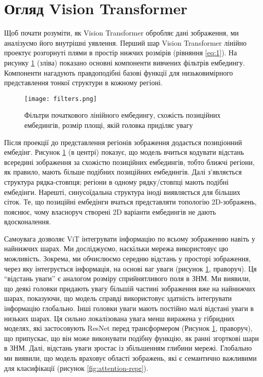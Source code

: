 \section{Огляд Vision Transformer}
Щоб почати розуміти, як Vision Transformer обробляє дані
зображення, ми аналізуємо його внутрішні уявлення. Перший шар
Vision Transformer лінійно проектує розгорнуті плями в простір
нижчих розмірів (рівняння \ref{eq:1}).
На рисунку \ref{fig:filters} (зліва) показано основні
компоненти вивчених фільтрів ембедингу.
Компоненти нагадують правдоподібні базові функції
для низьковимірного представлення тонкої структури в кожному
регіоні.

\begin{figure}[H]
    \centering
    \texttt{[image: filters.png]}
    \caption{Фільтри початкового лінійного ембедингу, схожість позиційних ембедингів, розмір площі, якій головка приділяє увагу}
    \label{fig:filters}
\end{figure}

Після проекції до представлення регіонів зображення додається
позиціонний ембедінг. Рисунок \ref{fig:filters} (в центрі) показує,
що модель вчиться кодувати відстань всередині зображення за схожістю
позиційних ембедингів, тобто ближчі регіони, як правило, мають більше
подібних позиційних ембедингів. Далі з'являється структура рядка-стовпця;
регіони в одному рядку/стовпці мають подібні ембедінги.
Нарешті, синусоїдальна структура іноді виявляється для більших сіток.
Те, що позиційні ембедінги вчаться представляти
топологію 2D-зображень, пояснює, чому власноруч
створені 2D варіанти ембедингів не дають
вдосконалення.

Самоувага дозволяє ViT інтегрувати інформацію по всьому
зображенню навіть у найнижчих шарах. Ми досліджуємо, наскільки мережа
використовує цю можливість. Зокрема, ми обчислюємо середню
відстань у просторі зображення, через яку інтегрується інформація,
на основі ваг уваги (рисунок \ref{fig:filters}, праворуч).
Ця ``відстань уваги'' є аналогом розміру сприйнятливого поля в ЗНМ.
Ми виявили, що деякі головки придають увагу більшій частині зображення
вже на найнижчих шарах, показуючи, що модель справді
використовує здатність інтегрувати інформацію глобально.
Інші головки уваги мають постійно малі відстані уваги в низьких шарах.
Ця сильно локалізована увага менш виражена у гібридних моделях,
які застосовують ResNet перед трансформером
(Рисунок \ref{fig:filters}, праворуч), що припускає, що він може
виконувати подібну функцію, як ранні згорткові шари в ЗНМ.
Далі, відстань уваги зростає із збільшенням глибини мережі.
Глобально ми виявили, що модель враховує області зображень,
які є семантично важливими для класифікації
(рисунок \ref{fig:attention-repr}).

